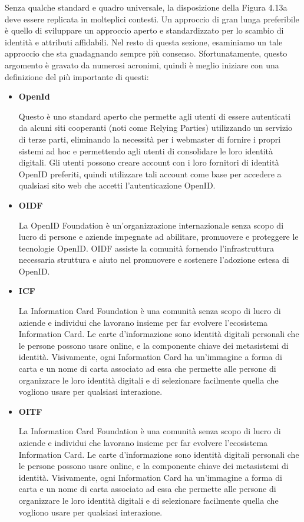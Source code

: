 Senza qualche standard e quadro universale, la disposizione della Figura 4.13a deve essere replicata in molteplici contesti. Un approccio di gran lunga preferibile è quello di sviluppare un approccio aperto e standardizzato per lo scambio di identità e attributi affidabili. Nel resto di questa sezione, esaminiamo un tale approccio che sta guadagnando sempre più consenso. Sfortunatamente, questo argomento è gravato da numerosi acronimi, quindi è meglio iniziare con una definizione del più importante di questi:

\begin{itemize}
    \item \textbf{OpenId}
    
    Questo è uno standard aperto che permette agli utenti di essere autenticati da alcuni siti cooperanti (noti come Relying Parties) utilizzando un servizio di terze parti, eliminando la necessità per i webmaster di fornire i propri sistemi ad hoc e permettendo agli utenti di consolidare le loro identità digitali. Gli utenti possono creare account con i loro fornitori di identità OpenID preferiti, quindi utilizzare tali account come base per accedere a qualsiasi sito web che accetti l'autenticazione OpenID.
    
    \item \textbf{OIDF}
    
    La OpenID Foundation è un'organizzazione internazionale senza scopo di lucro di persone e aziende impegnate ad abilitare, promuovere e proteggere le tecnologie OpenID. OIDF assiste la comunità fornendo l'infrastruttura necessaria struttura e aiuto nel promuovere e sostenere l'adozione estesa di OpenID.
    
    \item \textbf{ICF}
    
    La Information Card Foundation è una comunità senza scopo di lucro di aziende e individui che lavorano insieme per far evolvere l'ecosistema Information Card. Le carte d'informazione sono identità digitali personali che le persone possono usare online, e la componente chiave dei metasistemi di identità. Visivamente, ogni Information Card ha un'immagine a forma di carta e un nome di carta associato ad essa che permette alle persone di organizzare le loro identità digitali e di selezionare facilmente quella che vogliono usare per qualsiasi interazione.
    
    \item \textbf{OITF}
    
    La Information Card Foundation è una comunità senza scopo di lucro di aziende e individui che lavorano insieme per far evolvere l'ecosistema Information Card. Le carte d'informazione sono identità digitali personali che le persone possono usare online, e la componente chiave dei metasistemi di identità. Visivamente, ogni Information Card ha un'immagine a forma di carta e un nome di carta associato ad essa che permette alle persone di organizzare le loro identità digitali e di selezionare facilmente quella che vogliono usare per qualsiasi interazione.
    

\end{itemize}
